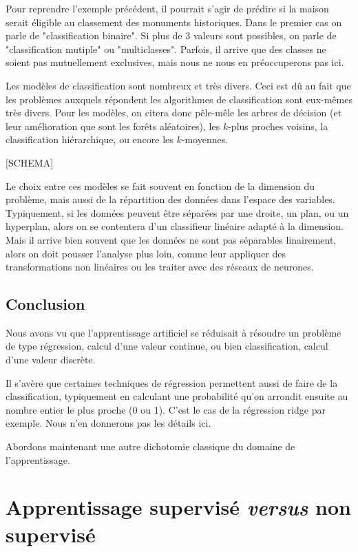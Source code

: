 Pour reprendre l'exemple précédent, il pourrait s'agir de prédire si la maison serait éligible au classement des monuments historiques. Dans le premier cas on parle de "classification binaire". Si plus de 3 valeurs sont possibles, on parle de "classification mutiple" ou "multiclasses". Parfois, il arrive que des classes ne soient pas mutuellement exclusives, mais nous ne nous en préoccuperons pas ici.

Les modèles de classification sont nombreux et très divers. Ceci est dû au fait que les problèmes auxquels répondent les algorithmes de classification sont eux-mêmes très divers. Pour les modèles, on citera donc pêle-mêle les arbres de décision (et leur amélioration que sont les forêts aléatoires), les \(k\)-plus proches voisins, la classification hiérarchique, ou encore les \(k\)-moyennes. 

[SCHEMA]

Le choix entre ces modèles se fait souvent en fonction de la dimension du problème, mais aussi de la répartition des données dans l'espace des variables. Typiquement, si les données peuvent être séparées par une droite, un plan, ou un hyperplan, alors on se contentera d'un classifieur linéaire adapté à la dimension. Mais il arrive bien souvent que les données ne sont pas séparables linairement, alors on doit pousser l'analyse plus loin, comme leur appliquer des transformations non linéaires ou les traiter avec des réseaux de neurones.


\subsection{Conclusion}
Nous avons vu que l'apprentissage artificiel se réduisait à résoudre un problème de type régression, calcul d'une valeur continue, ou bien classification, calcul d'une valeur discrète.

Il s'avère que certaines techniques de régression permettent aussi de faire de la classification, typiquement en calculant une probabilité qu'on arrondit ensuite au nombre entier le plus proche (0 ou 1). C'est le cas de la régression ridge par exemple. Nous n'en donnerons pas les détails ici.

Abordons maintenant une autre dichotomie classique du domaine de l'apprentissage.

\section{Apprentissage supervisé \textit{versus} non supervisé}
